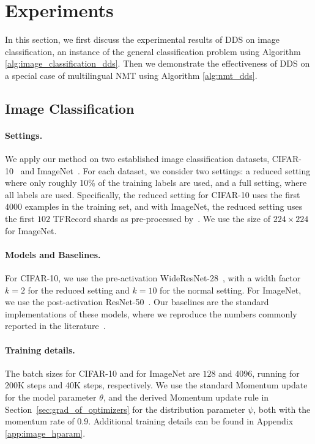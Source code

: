 \section{\label{sec:experiment}Experiments}
In this section, we first discuss the experimental results of DDS on image classification, an instance of the general classification problem using Algorithm \ref{alg:image_classification_dds}. Then we demonstrate the effectiveness of DDS on a special case of multilingual NMT using Algorithm \ref{alg:nmt_dds}.

\subsection{\label{exp:image_classification}Image Classification}

\paragraph{Settings.} We apply our method on two established image classification datasets, CIFAR-10~\citep{cifar10} and ImageNet~\citep{imagenet}. For each dataset, we consider two settings: a reduced setting where only roughly 10\% of the training labels are used, and a full setting, where all labels are used. Specifically, the reduced setting for CIFAR-10 uses the first $4000$ examples in the training set, and with ImageNet, the reduced setting uses the first $102$ TFRecord shards as pre-processed by~\citet{imagenet_generalize_better}. We use the size of $224 \times 224$ for ImageNet.

\paragraph{Models and Baselines.} For CIFAR-10, we use the pre-activation WideResNet-28~\citep{wide_res_net}, with a width factor $k=2$ for the reduced setting and $k=10$ for the normal setting. For ImageNet, we use the post-activation ResNet-50~\citep{res_net}. Our baselines are the standard implementations of these models, where we reproduce the numbers commonly reported in the literature~\citep{wide_res_net,res_net,resnext}.

\paragraph{Training details.} The batch sizes for CIFAR-10 and for ImageNet are $128$ and $4096$, running for 200K steps and 40K steps, respectively. We use the standard Momentum update for the model parameter $\theta$, and the derived Momentum update rule in Section~\ref{sec:grad_of_optimizers} for the distribution parameter $\psi$, both with the momentum rate of $0.9$. Additional training details can be found in Appendix \ref{app:image_hparam}.

